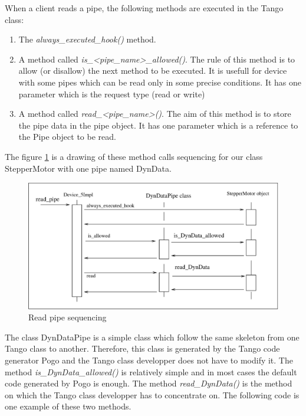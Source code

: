When a client reads a pipe, the following methods are executed in
the Tango class:
\begin{enumerate}
\item The \emph{always\_executed\_hook()} method.
\item A method called \emph{is\_<pipe\_name>\_allowed()}. The rule of this
method is to allow (or disallow) the next method to be executed. It
is usefull for device with some pipes which can be read only in some
precise conditions. It has one parameter which is the request type
(read or write)
\item A method called \emph{read\_<pipe\_name>()}. The aim of this method
is to store the pipe data in the pipe object. It has one parameter
which is a reference to the Pipe object to be read.
\end{enumerate}
The figure \ref{r_pipe_timing_fig-1} is a drawing of these method
calls sequencing for our class StepperMotor with one pipe named DynData.
\begin{figure}[H]
\begin{centering}
\includegraphics[scale=0.7]{ds_writing/r_pipe}
\par\end{centering}

\protect\caption{Read pipe sequencing\label{r_pipe_timing_fig-1}}
\end{figure}


The class DynDataPipe is a simple class which follow the same skeleton
from one Tango class to another. Therefore, this class is generated
by the Tango code generator Pogo and the Tango class developper does
not have to modify it. The method \emph{is\_DynData\_allowed()} is
relatively simple and in most cases the default code generated by
Pogo is enough. The method \emph{read\_DynData()} is the method on
which the Tango class developper has to concentrate on. The following
code is one example of these two methods.

